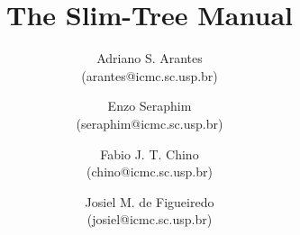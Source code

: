 \documentclass{book}
\begin{document}
\title{The Slim-Tree Manual}
\author{
   Adriano S. Arantes\\(arantes@icmc.sc.usp.br)\and
   Enzo Seraphim\\(seraphim@icmc.sc.usp.br)\and
	 Fabio J. T. Chino\\(chino@icmc.sc.usp.br)\and
   Josiel M. de Figueiredo\\(josiel@icmc.sc.usp.br)}
\maketitle

\newpage
\tableofcontents
\newpage









\appendix

\end{document}
